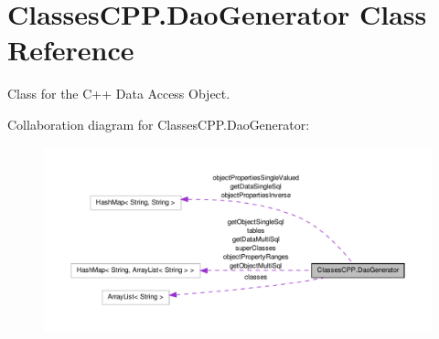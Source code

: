 \hypertarget{class_classes_c_p_p_1_1_dao_generator}{
\section{ClassesCPP.DaoGenerator Class Reference}
\label{class_classes_c_p_p_1_1_dao_generator}
}


Class for the C++ Data Access Object.  




Collaboration diagram for ClassesCPP.DaoGenerator:\nopagebreak
\begin{figure}[H]
\begin{center}
\leavevmode
\includegraphics[width=400pt]{class_classes_c_p_p_1_1_dao_generator__coll__graph}
\end{center}
\end{figure}
